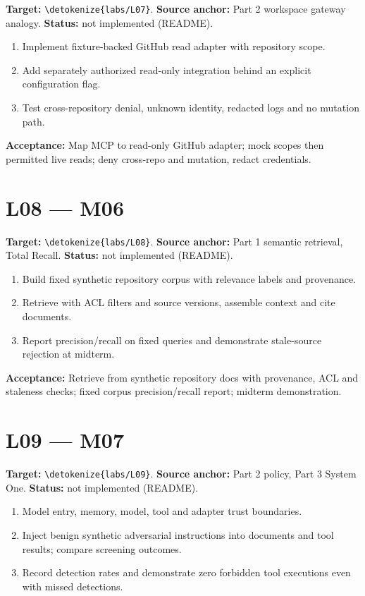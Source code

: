 \documentclass[11pt,letterpaper]{article}
\newcommand{\src}[1]{\expandafter\nolinkurl\expandafter{\detokenize{#1}}}
\begin{document}
\textbf{Target:} \src{labs/L07}. \textbf{Source anchor:} Part 2 workspace gateway analogy. \textbf{Status:} not implemented (README).

\begin{enumerate}
\item Implement fixture-backed GitHub read adapter with repository scope.
\item Add separately authorized read-only integration behind an explicit configuration flag.
\item Test cross-repository denial, unknown identity, redacted logs and no mutation path.
\end{enumerate}

\textbf{Acceptance:} Map MCP to read-only GitHub adapter; mock scopes then permitted live reads; deny cross-repo and mutation, redact credentials.

\section{L08 --- M06}

\textbf{Target:} \src{labs/L08}. \textbf{Source anchor:} Part 1 semantic retrieval, Total Recall. \textbf{Status:} not implemented (README).

\begin{enumerate}
\item Build fixed synthetic repository corpus with relevance labels and provenance.
\item Retrieve with ACL filters and source versions, assemble context and cite documents.
\item Report precision/recall on fixed queries and demonstrate stale-source rejection at midterm.
\end{enumerate}

\textbf{Acceptance:} Retrieve from synthetic repository docs with provenance, ACL and staleness checks; fixed corpus precision/recall report; midterm demonstration.

\section{L09 --- M07}

\textbf{Target:} \src{labs/L09}. \textbf{Source anchor:} Part 2 policy, Part 3 System One. \textbf{Status:} not implemented (README).

\begin{enumerate}
\item Model entry, memory, model, tool and adapter trust boundaries.
\item Inject benign synthetic adversarial instructions into documents and tool results; compare screening outcomes.
\item Record detection rates and demonstrate zero forbidden tool executions even with missed detections.
\end{enumerate}
\end{document}
